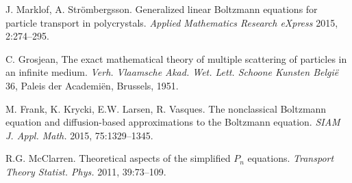 \documentclass[preprint,12pt]{elsarticle}
\begin{document}
\begin{thebibliography}{00}
\begin{small}
J. Marklof, A. Str\" ombergsson. Generalized linear Boltzmann equations for particle
transport in polycrystals. \textit{Applied Mathematics Research eXpress} 2015, 2:274--295.\vspace{-8pt}

C. Grosjean, The exact mathematical theory of multiple scattering of particles in an infinite medium.
\textit{Verh. Vlaamsche Akad. Wet. Lett. Schoone Kunsten Belgi\" e} 36, Paleis der
Academi\" en, Brussels, 1951.\vspace{-8pt}

M. Frank, K. Krycki, E.W. Larsen, R. Vasques. The nonclassical Boltzmann equation and diffusion-based approximations to the Boltzmann equation. \textit{SIAM J. Appl. Math.} 2015, 75:1329--1345.\vspace{-8pt}

R.G. McClarren. Theoretical aspects of the simplified $P_n$ equations. \textit{Transport Theory Statist. Phys.} 2011, 39:73--109.\vspace{-8pt}








  \end{small}



\end{thebibliography}

\pagebreak
\end{document}
